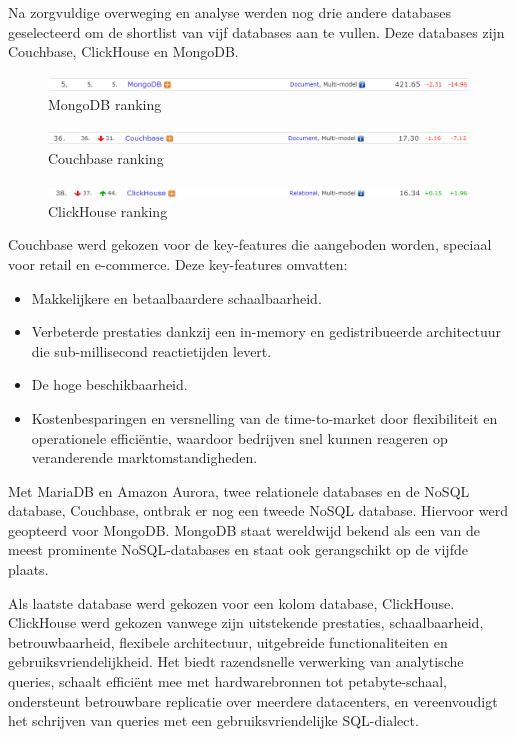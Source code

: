 Na zorgvuldige overweging en analyse werden nog drie andere databases geselecteerd om de shortlist van vijf databases aan te vullen. Deze databases zijn Couchbase, ClickHouse en MongoDB.
\begin{figure}[H]
    \centering
    \includegraphics[width=\linewidth]{"graphics/mongodb ranking"}
    \caption[MongoDB ranking]{MongoDB ranking~\autocite{DBEngines}}
    \label{fig:mongodb-ranking}
\end{figure}
\begin{figure}[H]
    \centering
    \includegraphics[width=\linewidth]{"graphics/couchbase ranking"}
    \caption[Couchbase ranking]{Couchbase ranking~\autocite{DBEngines}}
    \label{fig:couchbase-ranking}
\end{figure}
\begin{figure}[H]
    \centering
    \includegraphics[width=\linewidth]{"graphics/clickhouse ranking"}
    \caption[ClickHouse ranking]{ClickHouse ranking~\autocite{DBEngines}}
    \label{fig:clickhouse-ranking}
\end{figure}


Couchbase werd gekozen voor de key-features die aangeboden worden, speciaal voor retail en e-commerce. Deze key-features omvatten: ~\autocite{Couchbasea} 

\begin{itemize}
    \item Makkelijkere en betaalbaardere schaalbaarheid.
    \item Verbeterde prestaties dankzij een in-memory en gedistribueerde architectuur die sub-millisecond reactietijden levert.
    \item De hoge beschikbaarheid.
    \item Kostenbesparingen en versnelling van de time-to-market door flexibiliteit en operationele efficiëntie, waardoor bedrijven snel kunnen reageren op veranderende marktomstandigheden.
\end{itemize}

Met MariaDB en Amazon Aurora, twee relationele databases en de NoSQL database, Couchbase, ontbrak er nog een tweede NoSQL database. Hiervoor werd geopteerd voor MongoDB. MongoDB staat wereldwijd bekend als een van de meest prominente NoSQL-databases en staat ook gerangschikt op de vijfde plaats.

Als laatste database werd gekozen voor een kolom database, ClickHouse. ClickHouse werd gekozen vanwege zijn uitstekende prestaties, schaalbaarheid, betrouwbaarheid, flexibele architectuur, uitgebreide functionaliteiten en gebruiksvriendelijkheid. Het biedt razendsnelle verwerking van analytische queries, schaalt efficiënt mee met hardwarebronnen tot petabyte-schaal, ondersteunt betrouwbare replicatie over meerdere datacenters, en vereenvoudigt het schrijven van queries met een gebruiksvriendelijke SQL-dialect.~\autocite{ClickHousea}


